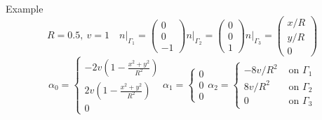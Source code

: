 \documentclass{beamer}
\begin{document}
\begin{frame}{Example}
\[  R=0.5,\ v=1\quad
  n\big\rvert_{\Gamma_1} =
  \begin{pmatrix}
    0\\0\\-1
  \end{pmatrix}
  n\big\rvert_{\Gamma_2} =
  \begin{pmatrix}
    0\\0\\1
  \end{pmatrix}
  n\big\rvert_{\Gamma_3} =
  \begin{pmatrix}
    x/R\\y/R\\0
  \end{pmatrix}
  \]
  \[
  \alpha_0 =
  \begin{cases}
    -2v\left(1-\frac{x^2+y^2}{R^2}\right)\\2v\left(1-\frac{x^2+y^2}{R^2}\right)\\0
  \end{cases}
  \alpha_1 =
  \begin{cases}
    0\\0\\0
  \end{cases}
  \alpha_2 =
  \begin{cases}
    -8v/R^2 & \mbox{ on } \Gamma_1\\
    8v/R^2 & \mbox{ on } \Gamma_2\\
    0 & \mbox{ on } \Gamma_3
  \end{cases}
  \]
\end{frame}
\end{document}
